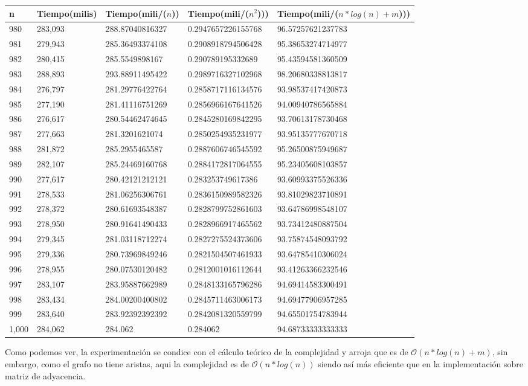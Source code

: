 \begin{table}[H]
\parbox{0.3\textwidth}{
    \begin{tabular}{ | l | l | l | l | l |}
    \hline
n   &Tiempo(milis) &Tiempo(mili/($n$)) &Tiempo(mili/($n^2$))) &Tiempo(mili/($n*log(n) + m$)))\\ \hline
980	&283,093	&288.87040816327	&0.2947657226155768	&96.57257621237783\\ \hline
981	&279,943	&285.36493374108	&0.2908918794506428	&95.38653274714977\\ \hline
982	&280,415	&285.5549898167	    &0.290789195332689	&95.43594581360509\\ \hline
983	&288,893	&293.88911495422	&0.2989716327102968	&98.20680338813817\\ \hline
984	&276,797	&281.29776422764	&0.2858717116134576	&93.98537417420873\\ \hline
985	&277,190	&281.41116751269	&0.2856966167641526	&94.00940786565884\\ \hline
986	&276,617	&280.54462474645	&0.2845280169842295	&93.70613178730468\\ \hline
987	&277,663	&281.3201621074	    &0.2850254935231977	&93.95135777670718\\ \hline
988	&281,872	&285.2955465587	    &0.2887606746545592	&95.26500875949687\\ \hline
989	&282,107	&285.24469160768	&0.2884172817064555	&95.23405608103857\\ \hline
990	&277,617	&280.42121212121	&0.283253749617386	&93.60993375526336\\ \hline
991	&278,533	&281.06256306761	&0.2836150989582326	&93.81029823710891\\ \hline
992	&278,372	&280.61693548387	&0.2828799752861603	&93.64786998548107\\ \hline
993	&278,950	&280.91641490433	&0.2828966917465562	&93.73412480887504\\ \hline
994	&279,345	&281.03118712274	&0.2827275524373606	&93.75874548093792\\ \hline
995	&279,336	&280.73969849246	&0.2821504507461933	&93.64785410306024\\ \hline
996	&278,955	&280.07530120482	&0.2812001016112644	&93.41263366232546\\ \hline
997	&283,107	&283.95887662989	&0.2848133165796286	&94.69414583300491\\ \hline
998	&283,434	&284.00200400802	&0.2845711463006173	&94.69477906957285\\ \hline
999	&283,640	&283.92392392392	&0.2842081320559799	&94.65501754783944\\ \hline
1,000	&284,062	&284.062	&0.284062	&94.68733333333333\\ \hline
    \end{tabular}
}
\end{table}

Como podemos ver, la experimentación se condice con el cálculo teórico de la complejidad y arroja que es de $\mathcal{O}(n*log(n) + m)$, sin embargo, como el grafo no tiene aristas, aqui la complejidad es de $\mathcal{O}(n*log(n))$ siendo así más eficiente que en la implementación sobre matriz de adyacencia.

